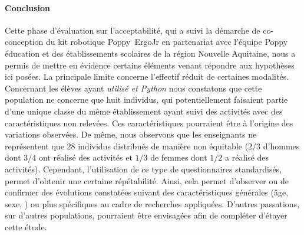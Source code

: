         \paragraph{Conclusion}
            Cette phase d'évaluation sur l'acceptabilité, qui a suivi la démarche de co-conception du kit robotique Poppy~ErgoJr en partenariat avec l'équipe Poppy éducation et des établissements scolaires de la région Nouvelle Aquitaine, nous a permis de mettre en évidence certains éléments venant répondre aux hypothèses ici posées.
            La principale limite concerne l'effectif réduit de certaines modalités. Concernant les élèves  ayant \textit{utilisé  et Python} nous constatons que cette population ne concerne que huit individus, qui potentiellement faisaient partie d'une unique classe du même établissement ayant suivi des activités avec des caractéristiques non relevées. Ces caractéristiques pourraient être à l'origine des variations observées. De même, nous observons que les enseignants ne représentent que 28 individus distribués de manière non équitable ($2/3$ d'hommes dont $3/4$ ont réalisé des activités et $1/3$ de femmes dont $1/2$ a réalisé des activités). Cependant, l'utilisation de ce type de questionnaires standardisés, permet d'obtenir une certaine répétabilité. Ainsi, cela permet d'observer ou de confirmer des évolutions constatées suivant des caractéristiques générales (âge, sexe, \etc) ou plus spécifiques au cadre de recherches appliquées. D'autres passations, sur d'autres populations, pourraient être envisagées afin de compléter \etou d'étayer cette étude.
